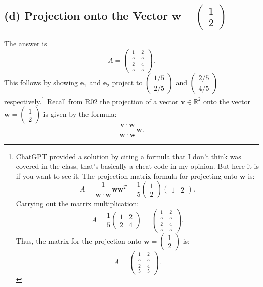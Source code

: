 \documentclass[11pt]{article}
\begin{document}
\subsection{(d) Projection onto the Vector \( \mathbf{w} = \begin{pmatrix} 1 \\ 2 \end{pmatrix} \)}
The answer is
\[
A = \begin{pmatrix} \frac{1}{5} & \frac{2}{5} \\ \frac{2}{5} & \frac{4}{5} \end{pmatrix}.
\]
This follows by showing $\mathbf{e}_1$ and $\mathbf{e}_2$ project to
$\begin{pmatrix} 1/5 \\ 2/5 \end{pmatrix}$
and $\begin{pmatrix} 2/5 \\ 4/5 \end{pmatrix}$
respectively.\footnote{ChatGPT provided a solution
    by citing a formula that I don't think was covered in the class,
    that's basically a cheat code in my opinion.
    But here it is if you want to see it.
    The projection matrix formula
    for projecting onto \( \mathbf{w} \) is:
    \[
    A = \frac{1}{\mathbf{w} \cdot \mathbf{w}} \mathbf{w} \mathbf{w}^T = \frac{1}{5} \begin{pmatrix} 1 \\ 2 \end{pmatrix} \begin{pmatrix} 1 & 2 \end{pmatrix}.
    \]
    Carrying out the matrix multiplication:
    \[
    A = \frac{1}{5} \begin{pmatrix} 1 & 2 \\ 2 & 4 \end{pmatrix} = \begin{pmatrix} \frac{1}{5} & \frac{2}{5} \\ \frac{2}{5} & \frac{4}{5} \end{pmatrix}.
    \]
    Thus, the matrix for the projection onto \( \mathbf{w} = \begin{pmatrix} 1 \\ 2 \end{pmatrix} \) is:
    \[
    A = \begin{pmatrix} \frac{1}{5} & \frac{2}{5} \\ \frac{2}{5} & \frac{4}{5} \end{pmatrix}.
    \]
}
Recall from R02 the projection of a vector \( \mathbf{v} \in \mathbb{R}^2 \) onto the vector
\( \mathbf{w} = \begin{pmatrix} 1 \\ 2 \end{pmatrix} \) is given by the formula:
\[
\frac{\mathbf{v} \cdot \mathbf{w}}{\mathbf{w} \cdot \mathbf{w}} \mathbf{w}.
\]
\end{document}
